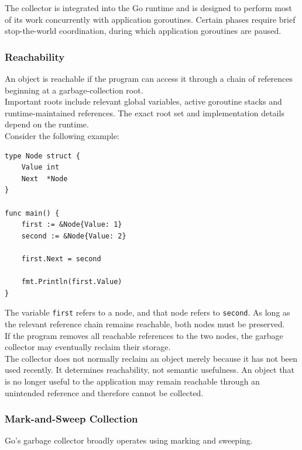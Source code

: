 The collector is integrated into the Go runtime and is designed to perform most of its work concurrently with application goroutines. Certain phases require brief stop-the-world coordination, during which application goroutines are paused.

\subsubsection{Reachability}

An object is reachable if the program can access it through a chain of references beginning at a garbage-collection root.\\

Important roots include relevant global variables, active goroutine stacks and runtime-maintained references. The exact root set and implementation details depend on the runtime.\\

Consider the following example:

\begin{lstlisting}
type Node struct {
    Value int
    Next  *Node
}

func main() {
    first := &Node{Value: 1}
    second := &Node{Value: 2}

    first.Next = second

    fmt.Println(first.Value)
}
\end{lstlisting}

The variable \texttt{first} refers to a node, and that node refers to \texttt{second}. As long as the relevant reference chain remains reachable, both nodes must be preserved.\\

If the program removes all reachable references to the two nodes, the garbage collector may eventually reclaim their storage.\\

The collector does not normally reclaim an object merely because it has not been used recently. It determines reachability, not semantic usefulness. An object that is no longer useful to the application may remain reachable through an unintended reference and therefore cannot be collected.\\

\subsubsection{Mark-and-Sweep Collection}

Go's garbage collector broadly operates using marking and sweeping.

